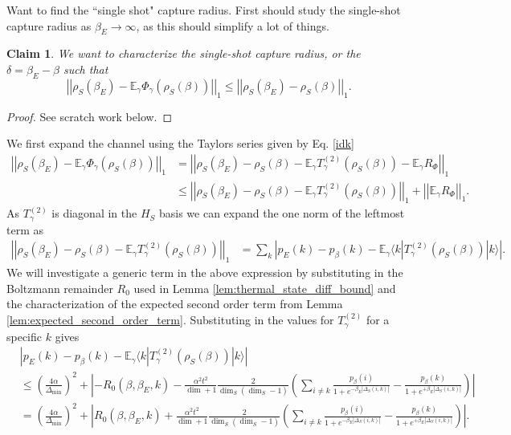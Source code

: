 \documentclass{article}
\newtheorem{claim}{Claim}
\newcommand{\ket}[1]{|#1\rangle}
\newcommand{\bra}[1]{\langle #1|}
\newcommand{\parens}[1]{\left( #1 \right)}
\newcommand{\abs}[1]{\left| #1 \right|}
\newcommand{\norm}[1]{\left| \left| #1 \right| \right|}
\begin{document}
Want to find the ``single shot" capture radius. First should study the single-shot capture radius as $\beta_E \to \infty$, as this should simplify a lot of things. 
\begin{claim}
    We want to characterize the single-shot capture radius, or the $\delta = \beta_E - \beta$ such that 
    \begin{equation}
        \norm{\rho_S(\beta_E) - \mathbb{E}_{\gamma} \Phi_{\gamma}(\rho_S(\beta))}_1 \leq  \norm{\rho_S(\beta_E) - \rho_S(\beta)}_1 .
    \end{equation}
\end{claim}
\begin{proof}
See scratch work below.
\end{proof}
We first expand the channel using the Taylors series given by Eq. \eqref{idk}
\begin{align}
    \norm{\rho_S(\beta_E) - \mathbb{E}_{\gamma} \Phi_{\gamma}(\rho_S(\beta))}_1 &= \norm{\rho_S(\beta_E) - \rho_S(\beta) - \mathbb{E}_{\gamma} T_{\gamma}^{(2)}(\rho_S(\beta)) - \mathbb{E}_{\gamma} R_{\Phi}}_1 \\
    &\leq \norm{\rho_S(\beta_E) - \rho_S(\beta) - \mathbb{E}_{\gamma} T_{\gamma}^{(2)}(\rho_S(\beta))}_1 + \norm{\mathbb{E}_{\gamma} R_{\Phi}}_1.
\end{align}
As $T_{\gamma}^{(2)}$ is diagonal in the $H_S$ basis we can expand the one norm of the leftmost term as
\begin{align}
    \norm{\rho_S(\beta_E) - \rho_S(\beta) - \mathbb{E}_{\gamma} T_{\gamma}^{(2)}(\rho_S(\beta))}_1 &= \sum_k \abs{p_E(k) - p_{\beta}(k) - \mathbb{E}_{\gamma} \bra{k}  T_{\gamma}^{(2)}(\rho_S(\beta)) \ket{k}} .
\end{align}
We will investigate a generic term in the above expression by substituting in the Boltzmann remainder $R_0$ used in Lemma \ref{lem:thermal_state_diff_bound} and the characterization of the expected second order term from Lemma \ref{lem:expected_second_order_term}. Substituting in the values for $T_{\gamma}^{(2)}$ for a specific $k$ gives
\begin{align}
    &\abs{p_E(k) - p_{\beta}(k) - \mathbb{E}_{\gamma} \bra{k} T_{\gamma}^{(2)}(\rho_S(\beta)) \ket{k}} \\
    &\leq \parens{\frac{4 \alpha}{\Delta_{\min}}}^2 + \abs{-R_0(\beta, \beta_E, k) - \frac{\alpha^2 t^2}{\dim + 1} \frac{2}{\dim_S (\dim_S - 1)}\parens{\sum_{i \neq k} \frac{p_{\beta}(i)}{1 + e^{-\beta_E |\Delta_S(i,k)|}} - \frac{p_{\beta}(k)}{1 + e^{+ \beta_E |\Delta_S(i,k)|}}}} \\
    &= \parens{\frac{4 \alpha}{\Delta_{\min}}}^2 + \abs{R_0(\beta, \beta_E, k) + \frac{\alpha^2 t^2}{\dim + 1} \frac{2}{\dim_S (\dim_S - 1)} \parens{\sum_{i \neq k} \frac{p_{\beta}(i)}{1 + e^{-\beta_E |\Delta_S(i,k)|}} - \frac{p_{\beta}(k)}{1 + e^{+ \beta_E |\Delta_S(i,k)|}}}}.
\end{align}
\end{document}

